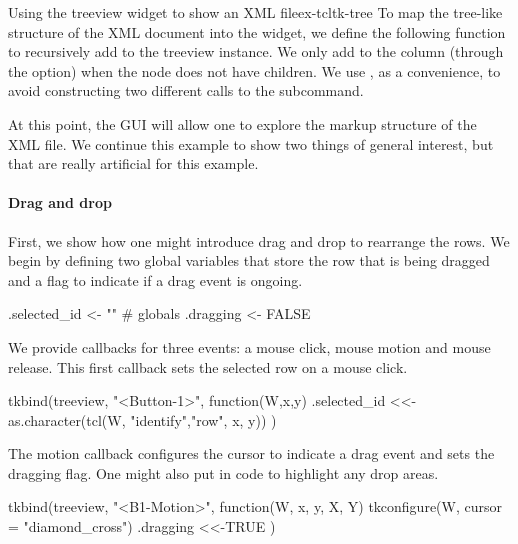 \begin{example}{Using the treeview widget to show an XML file}{ex-tcltk-tree}
To map the tree-like structure of the XML document into the widget, we
define the following function to recursively add to the treeview
instance.  We only add to the  column (through the
 option) when the node does not have children. We use
, as a convenience, to avoid constructing two different
calls to the  subcommand. 
\begin{Schunk}
\end{Schunk}
%
At this point, the GUI will allow one to explore the markup structure of the
XML file. We continue this example to show two things of general
interest, but that are really artificial for this example.


\paragraph{Drag and drop}
First, we show how one might introduce drag and drop to rearrange the
rows. We begin by defining two global variables that store the row
that is being dragged  and a flag to indicate if a drag event is ongoing.
\begin{Schunk}
\begin{Sinput}
 .selected_id <- ""                               # globals
 .dragging <- FALSE
\end{Sinput}
\end{Schunk}
We provide callbacks for three events: a mouse click, mouse motion and mouse release.
This first callback sets the selected row on a mouse click.
\begin{Schunk}
\begin{Sinput}
 tkbind(treeview, "<Button-1>", function(W,x,y) {
   .selected_id <<- as.character(tcl(W, "identify","row", x, y))
 })  
\end{Sinput}
\end{Schunk}
The motion callback configures the cursor to indicate a drag event and sets
the dragging flag. One might also put in code to highlight
any drop areas.
\begin{Schunk}
\begin{Sinput}
 tkbind(treeview, "<B1-Motion>", function(W, x, y, X, Y) {
   tkconfigure(W, cursor = "diamond_cross")
   .dragging <<-TRUE
 })
\end{Sinput}
\end{Schunk}


\end{example}
